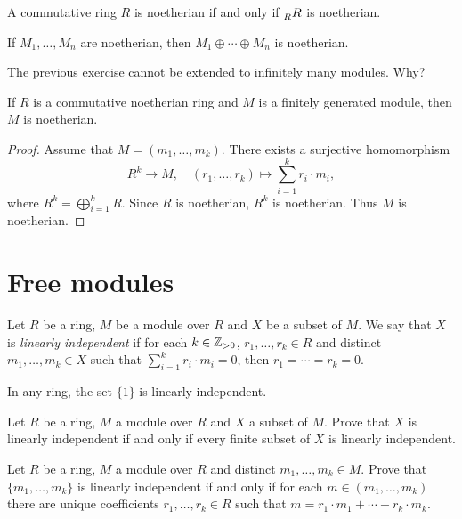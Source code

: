 \begin{exercise}
\label{xca:regular_noetheriano}
A commutative ring $R$ is noetherian if and only if $\prescript{}{R}{R}$ is noetherian.	
\end{exercise}

\begin{exercise}
\label{xca:directa_noetheriano}
If $M_1,\dots,M_n$ are noetherian, then $M_1\oplus\cdots\oplus M_n$ is noetherian. 	
\end{exercise}

The previous exercise cannot be extended to infinitely many modules. Why?

\begin{proposition}
If $R$ is a commutative noetherian ring 
and $M$ is a finitely generated module, then $M$ is noetherian. 
\end{proposition}

\begin{proof}
    Assume that $M=(m_1,\dots,m_k)$. There exists a surjective homomorphism  
\[
R^k\to M,\quad (r_1,\dots,r_k)\mapsto \sum_{i=1}^k r_i\cdot m_i,
\]
where
$R^k=\bigoplus_{i=1}^k R$. Since $R$ is noetherian, $R^k$ is noetherian. Thus $M$ is noetherian.	
\end{proof}


\section{Free modules}

\begin{definition}
    Let $R$ be a ring, $M$ be a module over $R$ and $X$ be a subset of $M$. We say that
    $X$ is \emph{linearly independent} if for each $k\in\mathbb{Z}_{>0}$, $r_1,\dots,r_k\in R$
    and distinct $m_1,\dots,m_k\in X$ such that $\sum_{i=1}^kr_i\cdot m_i=0$, then 
    $r_1=\cdots=r_k=0$.  
\end{definition}

In any ring, the set $\{1\}$ is linearly independent. 

\begin{exercise}
\label{xca:LI_finite}
    Let $R$ be a ring, $M$ a module over $R$ and $X$ a subset of $M$. Prove that 
    $X$ is linearly independent if and only if every finite subset of $X$ is linearly independent. 
\end{exercise}

\begin{exercise}
    \label{xca:LI}
    Let $R$ be a ring, $M$ a module over $R$ and distinct $m_1,\dots,m_k\in M$. Prove that 
    $\{m_1,\dots,m_k\}$ is linearly independent if and only if for each $m\in (m_1,\dots,m_k)$ there are unique 
    coefficients $r_1,\dots,r_k\in R$ such that 
    $m=r_1\cdot m_1+\cdots+r_k\cdot m_k$. 
\end{exercise}

